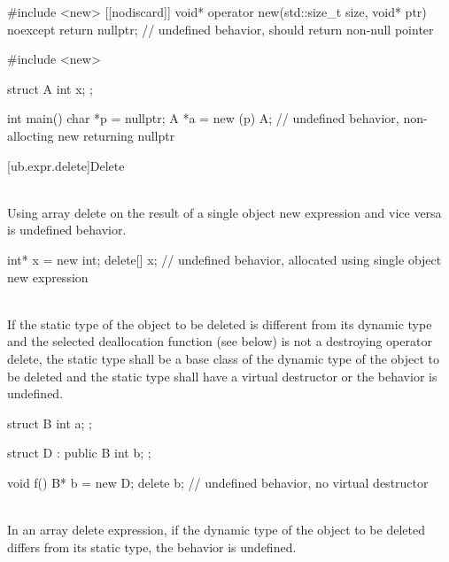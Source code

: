 \pnum
\begin{example}
\begin{codeblock}
#include <new>
[[nodiscard]] void* operator new(std::size_t size, void* ptr) noexcept {
  return nullptr;       // undefined behavior,  should return non-null pointer
}
\end{codeblock}
\end{example}
\begin{example}
\begin{codeblock}
#include <new>

struct A {
  int x;
};

int main() {
  char *p = nullptr;
  A *a = new (p) A;     // undefined behavior, non-allocting new returning nullptr
}
\end{codeblock}
\end{example}


[ub.expr.delete]{Delete}

\pnum
{} \\
Using array delete on the result of a single object new expression and vice versa is undefined behavior.

\pnum
\begin{example}
\begin{codeblock}
int* x = new int;
delete[] x;             // undefined behavior, allocated using single object new expression
\end{codeblock}
\end{example}


\pnum
{} \\
If the static type of the object to be deleted is different from its dynamic
type and the selected deallocation function (see below) is not a destroying operator delete, the static type
shall be a base class of the dynamic type of the object to be deleted and the static type shall have a virtual
destructor or the behavior is undefined.

\pnum
\begin{example}
\begin{codeblock}
struct B {
  int a;
};

struct D : public B {
  int b;
};

void f() {
  B* b = new D;
  delete b;             // undefined behavior, no virtual destructor
}
\end{codeblock}
\end{example}


\pnum
{} \\
In an array delete expression, if the dynamic type of the object to be deleted differs from its static type, the behavior is undefined.

